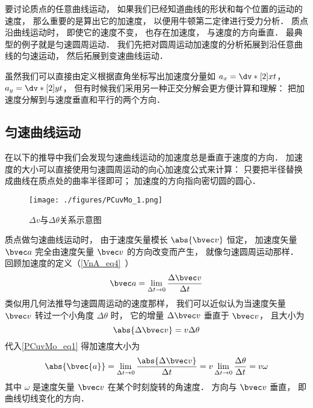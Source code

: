 

要讨论质点的任意曲线运动， 如果我们已经知道曲线的形状和每个位置的运动的速度， 那么重要的是算出它的加速度， 以便用牛顿第二定律进行受力分析． 质点沿曲线运动时， 即使它的速度不变， 也存在加速度， 与速度的方向垂直． 最典型的例子就是匀速圆周运动． 我们先把对圆周运动加速度的分析拓展到沿任意曲线的匀速运动， 然后拓展到变速曲线运动．

虽然我们可以直接由定义根据直角坐标写出加速度分量如 $a_x = \dv*[2]{x}{t}$， $a_y = \dv*[2]{y}{t}$， 但有时候我们采用另一种正交分解会更方便计算和理解： 把加速度分解到与速度垂直和平行的两个方向．

\subsection{匀速曲线运动}
在以下的推导中我们会发现匀速曲线运动的加速度总是垂直于速度的方向． 加速度的大小可以直接使用匀速圆周运动的向心加速度公式来计算： 只要把半径替换成曲线在质点处的曲率半径即可； 加速度的方向指向密切圆的圆心．
\begin{figure}[ht]
\centering
\texttt{[image: ./figures/PCuvMo\_1.png]}
\caption{$\Delta v$与$\Delta \theta$关系示意图} \label{PCuvMo_fig1}
\end{figure}

质点做匀速曲线运动时， 由于速度矢量模长 $\abs{\bvec v}$ 恒定， 加速度矢量 $\bvec a$ 完全由速度矢量 $\bvec v$ 的方向改变而产生， 就像匀速圆周运动那样． 回顾加速度的定义（\autoref{VnA_eq4}~）
\begin{equation}\label{PCuvMo_eq2}
\bvec a = \lim_{\Delta t \to 0} \frac{\Delta \bvec v}{\Delta t}
\end{equation}
类似用几何法推导匀速圆周运动的速度那样， 我们可以近似认为当速度矢量 $\bvec v$ 转过一个小角度 $\Delta \theta$ 时， 它的增量 $\Delta \bvec v$ 垂直于 $\bvec v$， 且大小为
\begin{equation}\label{PCuvMo_eq1}
\abs{\Delta \bvec v} = v\Delta\theta
\end{equation}
代入\autoref{PCuvMo_eq1} 得加速度大小为
\begin{equation}\label{PCuvMo_eq4}
\abs{\bvec{a}} = \lim_{\Delta t \to 0} \frac{\abs{\Delta \bvec v}}{\Delta t}
= v\lim_{\Delta t \to 0}\frac{\Delta \theta}{\Delta t} = v\omega
\end{equation}
其中 $\omega$ 是速度矢量 $\bvec v$ 在某个时刻旋转的角速度． 方向与 $\bvec v$ 垂直， 即曲线切线变化的方向．

